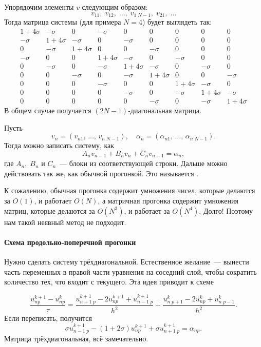 \documentclass{trlnotes}
\begin{document}
Упорядочим элементы $v$ следующим образом:
\[
	v_{11}, \; v_{12}, \; \ldots, \; v_{1 \; N-1}, \; v_{21}, \; \ldots
\]
Тогда матрица системы (для примера $N=4$) будет выглядеть так:
\[
	\begin{array}{ccc|ccc|ccc}
		1 + 4\sigma & -\sigma & 0 & -\sigma & 0 & 0 & 0 & 0 & 0 \\
		-\sigma & 1 + 4\sigma & -\sigma & 0 & -\sigma & 0 & 0 & 0 & 0 \\
		0 & -\sigma & 1 + 4\sigma & 0 & 0 & -\sigma & 0 & 0 & 0 \\
		\hline
		-\sigma & 0 & 0 & 1 + 4\sigma & -\sigma & 0 & -\sigma & 0 & 0 \\
		0 & -\sigma & 0 & -\sigma & 1 + 4\sigma & -\sigma & 0 & -\sigma & 0 \\
		0 & 0 & -\sigma & 0 & -\sigma & 1 + 4\sigma & 0 & 0 & -\sigma \\
		\hline
		0 & 0 & 0 & -\sigma & 0 & 0 & 1 + 4\sigma & -\sigma & 0 \\
		0 & 0 & 0 & 0 & -\sigma & 0 &  -\sigma & 1 + 4\sigma & -\sigma \\
		0 & 0 & 0 & 0 & 0 & -\sigma & 0 & -\sigma & 1 + 4\sigma
	\end{array}
\]
В общем случае получается $(2N-1)$-диагональная матрица.

Пусть
\[
	v_n = (v_{n1}, \, \ldots, \, v_{n \; N-1}), \quad \alpha_n = (\alpha_{n1}, \, \ldots, \, \alpha_{n \; N-1}).
\]
Тогда можно записать систему, как
\[
	A_n v_{n-1} + B_n v_n + C_n v_{n+1} = \alpha_{n},
\]
где $A_n, \; B_n$ и $C_n$~--- блоки из соответствующей строки.
Дальше можно действовать так же, как обычной прогонкой. Это называется .

К сожалению, обычная прогонка содержит умножения чисел, которые делаются за $O(1)$, и работает $O(N)$, а матричная прогонка содержит умножения матриц, которые делаются за $O(N^3)$, и работает за $O(N^4)$. Долго! Поэтому нам такой неявный метод не подходит.

\paragraph{Схема продольно-поперечной прогонки}

Нужно сделать систему трёхдиагональной. Естественное желание~--- вынести часть переменных в правой части уравнения на соседний слой, чтобы сократить количество тех, что входит с текущего. Эта идея приводит к схеме

\[
	\dfrac{u^{k+1}_{np} - u^{k}_{np}}{\tau} = \dfrac{u^{k+1}_{n+1 \; p} - 2u^{k+1}_{np} + u^{k+1}_{n-1 \; p}}{h^2} + \dfrac{u^k_{n \; p+1} - 2u^k_{np} + u^k_{n \; p - 1}}{h^2}.
\]
Если переписать, получится
\[
	\sigma u^{k+1}_{n-1 \; p} - (1 + 2\sigma) u_{np}^{k+1} + \sigma u^{k+1}_{n+1 \; p} = \alpha_{np}.
\]
Матрица трёхдиагональная, всё замечательно.
\end{document}
